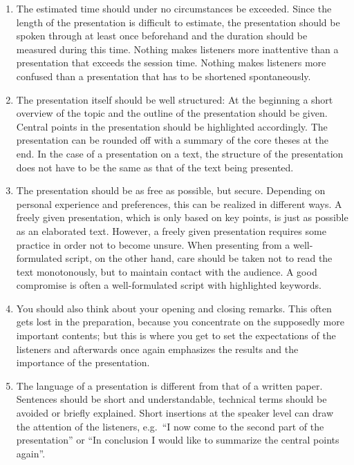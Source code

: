 \documentclass[
  english,
]{scrreprt}
\begin{document}
\begin{enumerate}
\def\labelenumi{\arabic{enumi}.}
\item
  The estimated time should under no circumstances be exceeded. Since the length of the presentation is difficult to estimate, the presentation should be spoken through at least once beforehand and the duration should be measured during this time. Nothing makes listeners more inattentive than a presentation that exceeds the session time. Nothing makes listeners more confused than a presentation that has to be shortened spontaneously.
\item
  The presentation itself should be well structured: At the beginning a short overview of the topic and the outline of the presentation should be given. Central points in the presentation should be highlighted accordingly. The presentation can be rounded off with a summary of the core theses at the end. In the case of a presentation on a text, the structure of the presentation does not have to be the same as that of the text being presented.
\item
  The presentation should be as free as possible, but secure. Depending on personal experience and preferences, this can be realized in different ways. A freely given presentation, which is only based on key points, is just as possible as an elaborated text. However, a freely given presentation requires some practice in order not to become unsure. When presenting from a well-formulated script, on the other hand, care should be taken not to read the text monotonously, but to maintain contact with the audience. A good compromise is often a well-formulated script with highlighted keywords.
\item
  You should also think about your opening and closing remarks. This often gets lost in the preparation, because you concentrate on the supposedly more important contents; but this is where you get to set the expectations of the listeners and afterwards once again emphasizes the results and the importance of the presentation.
\item
  The language of a presentation is different from that of a written paper. Sentences should be short and understandable, technical terms should be avoided or briefly explained. Short insertions at the speaker level can draw the attention of the listeners, e.g.~“I now come to the second part of the presentation” or “In conclusion I would like to summarize the central points again”.
\end{enumerate}
\end{document}
